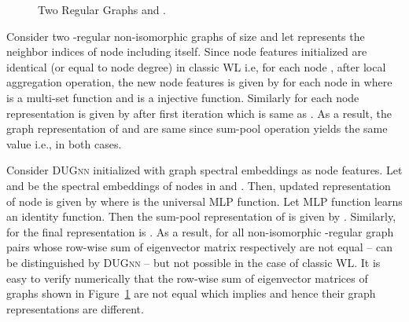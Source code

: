 \documentclass{article}
\begin{document}
\begin{figure}[!h]
	\centering
	\caption{Two Regular Graphs  and .}\label{fig:reg_graphs}
\end{figure}

Consider two -regular non-isomorphic graphs of size  and let  represents the neighbor indices of  node including itself.  Since node features initialized are identical (or equal to node degree) in classic WL  i.e,  for each node , after local aggregation operation, the new node features is given by  for  each node in  where  is a multi-set function and  is a injective function. Similarly for  each node representation is given by  after first iteration which is same as . As a result, the graph representation of  and  are same since sum-pool operation yields the same value i.e.,  in both cases. 

Consider \textsc{DUGnn}  initialized  with graph spectral embeddings  as node features. Let  and  be the spectral embeddings of nodes in and . Then, updated representation  of    node is given by   where  is the universal MLP function.  Let  MLP  function learns an identity function. Then the sum-pool representation of  is given by . Similarly, for  the final representation is  .  As a result, for all non-isomorphic -regular graph pairs whose  row-wise sum of eigenvector matrix respectively are not equal -- can be distinguished by \textsc{DUGnn} -- but not possible in the case of   classic WL.  It is easy to verify numerically that the row-wise sum of eigenvector matrices  of graphs   shown in Figure~\ref{fig:reg_graphs}  are not equal which implies   and hence their graph representations  are different.
\end{document}
